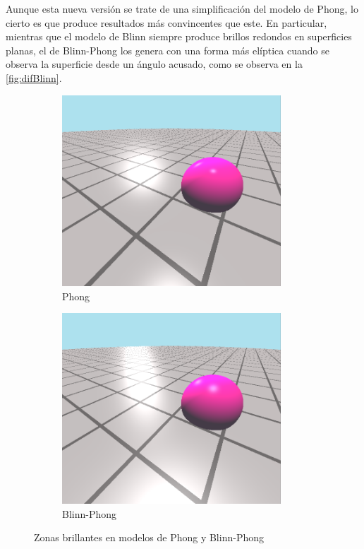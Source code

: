 Aunque esta nueva versión se trate de una simplificación del modelo de Phong, lo cierto es que produce resultados más convincentes que este. En particular, mientras que el modelo de Blinn siempre produce brillos redondos en superficies planas, el de Blinn-Phong los genera con una forma más elíptica cuando se observa la superficie desde un ángulo acusado, como se observa en la \autoref{fig:difBlinn}. 
\begin{figure}[!h]
     \begin{subfigure}[b]{0.49\linewidth}
        \centering
        \includegraphics[width=0.9\textwidth]{Plantilla-TFG-master/img/compB.png}
        \caption{Phong}
     \end{subfigure}
     \begin{subfigure}[b]{0.49\linewidth}
        \centering
        \includegraphics[width=0.9\textwidth]{Plantilla-TFG-master/img/compBP.png}
        \caption{Blinn-Phong}
     \end{subfigure}
     \caption{Zonas brillantes en modelos de Phong y Blinn-Phong}
     \label{fig:difBlinn}
\end{figure}

